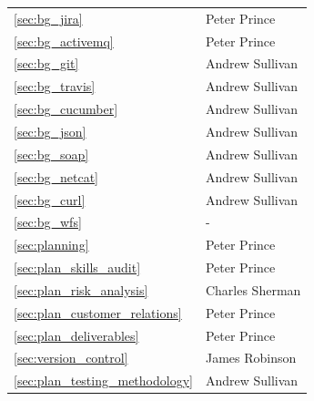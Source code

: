\documentclass[a4paper, 12pt, twoside]{article}
\newcommand*{\fullref}[1]{\ref{#1} \nameref{#1}}
\begin{document}
\begin{tabularx}{\textwidth}{|X|X|}
  \fullref{sec:bg_jira}                  & Peter Prince                       \\
  \fullref{sec:bg_activemq}              & Peter Prince                       \\
  \fullref{sec:bg_git}                   & Andrew Sullivan                    \\
  \fullref{sec:bg_travis}                & Andrew Sullivan                    \\
  \fullref{sec:bg_cucumber}              & Andrew Sullivan                    \\
  \fullref{sec:bg_json}                  & Andrew Sullivan                    \\
  \fullref{sec:bg_soap}                  & Andrew Sullivan                    \\
  \fullref{sec:bg_netcat}                & Andrew Sullivan                    \\
  \fullref{sec:bg_curl}                  & Andrew Sullivan                    \\
  \fullref{sec:bg_wfs}                   & -                                  \\ \hline
  \fullref{sec:planning}                 & Peter Prince                       \\
  \fullref{sec:plan_skills_audit}        & Peter Prince                       \\
  \fullref{sec:plan_risk_analysis}       & Charles Sherman                    \\
  \fullref{sec:plan_customer_relations}  & Peter Prince                       \\
  \fullref{sec:plan_deliverables}        & Peter Prince                       \\
  \fullref{sec:version_control}          & James Robinson                     \\
  \fullref{sec:plan_testing_methodology} & Andrew Sullivan                    \\ \hline
\end{tabularx}
\newpage
\end{document}
